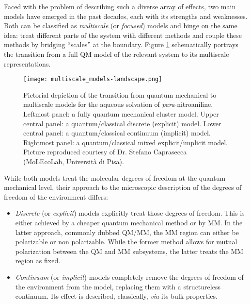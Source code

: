 Faced with the problem of describing such a diverse array of effects,
two main models have emerged in the past decades, each with its
strengths and weaknesses.
Both can be classified as \emph{multiscale} (or \emph{focused})
models\autocite{Nobel2013} and hinge on the same idea: treat different
parts of the system with different methods and couple these methods by
bridging \enquote{scales} at the boundary.
Figure \ref{fig:qm-to-multiscale} schematically portrays the transition
from a full \acrshort{QM} model of the relevant system to its multiscale
representations.

\begin{figure}[tb]
\centering
\texttt{[image: multiscale\_models-landscape.png]}
\caption[From quantum mechanical to multiscale models]{
Pictorial depiction of the transition from quantum mechanical to
multiscale models for the aqueous solvation of \emph{para}-nitroaniline.
Leftmost panel: a fully quantum mechanical cluster model.
Upper central panel: a quantum/classical discrete (explicit) model.
Lower central panel: a quantum/classical continuum (implicit) model.
Rightmost panel: a quantum/classical mixed explicit/implicit model.
Picture reproduced courtesy of Dr. Stefano Caprasecca (MoLEcoLab, Università di Pisa).}
\label{fig:qm-to-multiscale}
\end{figure}

While both models treat the molecular degrees of freedom at the quantum
mechanical level, their approach to the microscopic description of the
degrees of freedom of the environment differs:
\begin{itemize}
 \item
   \emph{Discrete} (or \emph{explicit}) models explicitly treat those
   degrees of freedom.
   This is either achieved by a cheaper quantum mechanical
   method\autocite{Vreven2006-gx} or by \gls{MM}.\autocite{Senn2009-sk}
   In the latter approach, commonly dubbed \acrshort{QM}/\acrshort{MM}, the \acrshort{MM}
   region can either be polarizable\autocite{Mennucci2013-go,
   Olsen2010-wa, Lipparini2011-rd} or non
   polarizable. While the former method allows for mutual polarization
   between the \acrshort*{QM} and \acrshort*{MM} subsystems, the latter
   treats the \acrshort*{MM} region as fixed.
 \item
   \emph{Continuum} (or \emph{implicit}) models completely remove the degrees
   of freedom of the environment from the model, replacing them with a
   structureless continuum.
   Its effect is described, classically, \emph{via} its bulk
   properties.\autocite{Onsager1936-wf, Miertus1981-mm}
\end{itemize}


